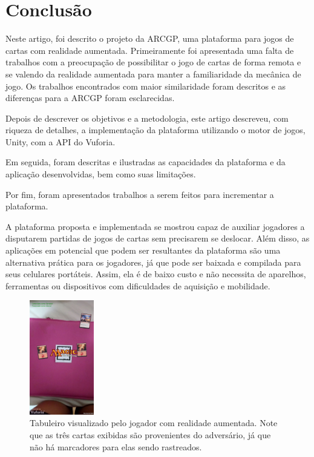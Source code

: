 \documentclass[conference]{IEEEtran}
\begin{document}
\section{Conclusão}
\label{conclusao}
Neste artigo, foi descrito o projeto da ARCGP, uma plataforma para jogos de 
cartas com realidade aumentada. Primeiramente foi apresentada uma falta de 
trabalhos com a preocupação de possibilitar o jogo de cartas de forma remota e 
se valendo da realidade aumentada para manter a familiaridade da mecânica de 
jogo. Os trabalhos encontrados com maior similaridade foram descritos e as 
diferenças para a ARCGP foram esclarecidas.

Depois de descrever os objetivos e a metodologia, este artigo descreveu, com 
riqueza de detalhes, a implementação da plataforma utilizando o motor de jogos, 
Unity, com a API do Vuforia.

Em seguida, foram descritas e ilustradas as capacidades da plataforma e da 
aplicação desenvolvidas, bem como suas limitações.

Por fim, foram apresentados trabalhos a serem feitos para incrementar a 
plataforma.

A plataforma proposta e implementada se mostrou capaz de auxiliar jogadores 
a disputarem partidas de jogos de cartas sem precisarem se deslocar. Além disso, 
as aplicações em potencial que podem ser resultantes da plataforma são uma 
alternativa prática para os jogadores, já que pode ser baixada e compilada para 
seus celulares portáteis. Assim, ela é de baixo custo e não necessita de 
aparelhos, ferramentas ou dispositivos com dificuldades de aquisição e 
mobilidade.

\begin{figure}[t]
	\caption{Tabuleiro visualizado pelo jogador com realidade aumentada. Note 
		que as três cartas exibidas são provenientes do adversário, já que não 
		há marcadores para elas sendo rastreados.}
	\label{enemytable}
	\centering
	\includegraphics[width=0.25\textwidth]{enemytable}
\end{figure}



\end{document}
